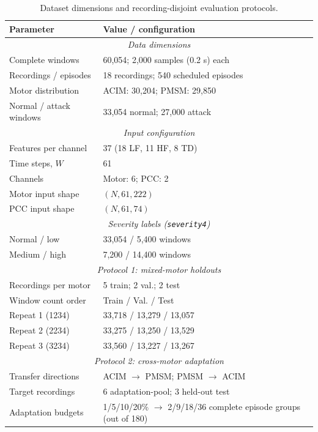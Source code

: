 \documentclass[letterpaper,journal]{IEEEtran}
\begin{document}
\begin{table}[t]
\centering
\footnotesize
\caption{Dataset dimensions and recording-disjoint
evaluation protocols.}
\label{tab:evaluation_protocols}
\renewcommand{\arraystretch}{1.10}
\setlength{\tabcolsep}{2pt}

\begin{tabular}{@{}p{}p{}@{}}
\hline
Parameter & Value / configuration \\
\hline
\multicolumn{2}{c}{\textit{Data dimensions}} \\
\hline
Complete windows & 60,054; 2,000 samples (0.2 s) each \\
Recordings / episodes & 18 recordings; 540 scheduled episodes \\
Motor distribution & ACIM: 30,204; PMSM: 29,850 \\
Normal / attack windows & 33,054 normal; 27,000 attack \\

\hline
\multicolumn{2}{c}{\textit{Input configuration}} \\
\hline
Features per channel & 37 (18 LF, 11 HF, 8 TD) \\
Time steps, $W$ & 61 \\
Channels & Motor: 6; PCC: 2 \\
Motor input shape & $(N,61,222)$ \\
PCC input shape & $(N,61,74)$ \\

\hline
\multicolumn{2}{c}{\textit{Severity labels (\texttt{severity4})}} \\
\hline
Normal / low & 33,054 / 5,400 windows \\
Medium / high & 7,200 / 14,400 windows \\

\hline
\multicolumn{2}{c}{\textit{Protocol 1: mixed-motor holdouts}} \\
\hline
Recordings per motor & 5 train; 2 val.; 2 test \\
Window count order & Train / Val. / Test \\
Repeat 1 (1234) & 33,718 / 13,279 / 13,057 \\
Repeat 2 (2234) & 33,275 / 13,250 / 13,529 \\
Repeat 3 (3234) & 33,560 / 13,227 / 13,267 \\

\hline
\multicolumn{2}{c}{\textit{Protocol 2: cross-motor adaptation}} \\
\hline
Transfer directions &
ACIM $\rightarrow$ PMSM;
PMSM $\rightarrow$ ACIM \\
Target recordings &
6 adaptation-pool; 3 held-out test \\
Adaptation budgets &
1/5/10/20\% $\rightarrow$ 2/9/18/36
complete episode groups (out of 180) \\
\hline
\end{tabular}


\end{table}
\end{document}
